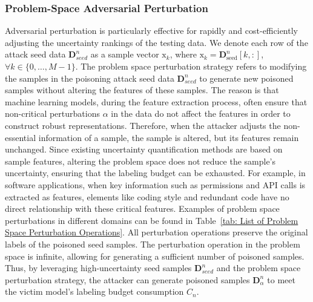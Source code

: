 \documentclass[lettersize,journal]{IEEEtran}
\begin{document}
\subsubsection{Problem-Space Adversarial Perturbation}
\label{Sec: Strategy I-Problem-Space Perturbation}
Adversarial perturbation is particularly effective for rapidly and cost-efficiently adjusting the uncertainty rankings of the testing data.
We denote each row of the attack seed data $\bm{D}_{seed}^{n}$ as a sample vector $\bm{\mathrm{x}}_{k}$, where $\bm{\mathrm{x}}_{k} = \bm{D}_{\text{seed}}^{n}[k,:]$,$\forall k \in \{0, \dots, M-1 \}$.
The problem space perturbation strategy refers to modifying the samples in the poisoning attack seed data $\bm{D}_{seed}^{n}$ to generate new poisoned samples without altering the features of these samples.
The reason is that machine learning models, during the feature extraction process, often ensure that non-critical perturbations $\alpha$ in the data do not affect the features in order to construct robust representations.
Therefore, when the attacker adjusts the non-essential information of a sample, the sample is altered, but its features remain unchanged.
Since existing uncertainty quantification methods are based on sample features, altering the problem space does not reduce the sample's uncertainty, ensuring that the labeling budget can be exhausted.
For example, in software applications, when key information such as permissions and API calls is extracted as features, elements like coding style and redundant code have no direct relationship with these critical features.
Examples of problem space perturbations in different domains can be found in Table~\ref{tab: List of Problem Space Perturbation Operations}.
All perturbation operations preserve the original labels of the poisoned seed samples.
The perturbation operation in the problem space is infinite, allowing for generating a sufficient number of poisoned samples.
Thus, by leveraging high-uncertainty seed samples $\bm{D}_{seed}^{n}$ and the problem space perturbation strategy, the attacker can generate poisoned samples $\bm{D}_{\alpha}^{n}$ to meet the victim model's labeling budget consumption $C_{n}$.
\end{document}
